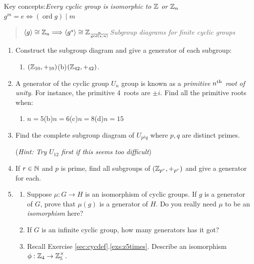 \begin{exercises}
	Key concepts:\quad \emph{Every cyclic group is isomorphic to $\mathbb{Z}$ or $\mathbb{Z}_n$ \qquad$g^m=e\iff (\operatorname{ord}g)\mid m$}
	\begin{quote}
		\emph{$\left\langle g\right\rangle\cong\mathbb{Z}_n\Longrightarrow \left\langle g^s\right\rangle\cong\mathbb{Z}_{\frac n{\gcd(s,n)}}$\qquad Subgroup diagrams for finite cyclic groups}
	\end{quote}
	
	
	\begin{enumerate}
		\item Construct the subgroup diagram and give a generator of each subgroup:
		\begin{enumerate}
		  \item $(\mathbb{Z}_{10},+_{10})$\qquad\qquad (b)\lstsp $(\mathbb{Z}_{42},+_{42})$.
		\end{enumerate}
	  
	  
	  \item A generator of the cyclic group $U_n$ group is known as a \emph{primitive $n\textsuperscript{th}$ root of unity.} For instance, the primitive 4\th\ roots are $\pm i$. Find all the primitive roots when:
	  \begin{enumerate}
	    \item $n=5$\hfill (b)\lstsp $n=6$\hfill (c)\lstsp $n=8$\hfill (d)\lstsp $n=15$\hspace*{\fill}\hspace*{\fill}
	  \end{enumerate}
		
		
		\item Find the complete subgroup diagram of $U_{p^2q}$ where $p,q$ are distinct primes.\par
		(\emph{Hint: Try $U_{12}$ first if this seems too difficult})
	  
	  
	  \item If $r\in\mathbb{N}$ and $p$ is prime, find all subgroups of $(\mathbb{Z}_{p^r},+_{p^r})$ and give a generator for each.
	  
	  		
	  \item\begin{enumerate}
	    \item Suppose $\mu:G\to H$ is an isomorphism of cyclic groups. If $g$ is a generator of $G$, prove that $\mu(g)$ is a generator of $H$. Do you really need $\mu$ to be an \emph{isomorphism} here?
	  
	  	\item If $G$ is an infinite cyclic group, how many generators has it got?
	  	
			\item Recall Exercise \ref*{sec:cycdef}.\ref{exs:z5times}. Describe an isomorphism $\phi:\mathbb{Z}_4\to\mathbb{Z}_5^\times$.
	  \end{enumerate} 
	  

\end{enumerate}
\end{exercises}
